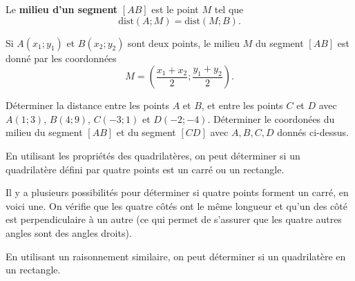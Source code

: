 \documentclass[a4paper,12pt]{report}
\begin{document}
\begin{boiteExT}
    \vspace{4cm}
\end{boiteExT}

\begin{defi}
    Le {\bfseries milieu d'un segment} $[AB]$ est le point $M$ tel que
    \[\text{dist}(A;M)=\text{dist}(M;B).\]
\end{defi}
        
\begin{rem}
    Si $A(x_1;y_1)$ et $B(x_2;y_2)$ sont deux points, le milieu $M$ du segment
    $[AB]$ est donné par les coordonnées
\[M=\left(\dfrac{x_1+x_2}{2};\dfrac{y_1+y_2}{2}\right).\]
\end{rem}
    

\begin{exo}
\begin{tasks}
    \task Déterminer la distance entre les points $A$ et $B$, et entre les points $C$ et $D$ avec $A(1;3)$, $B(4;9)$, $C(-3;1)$ et $D(-2;-4)$. 
    \task Déterminer le coordonées du milieu du segment $[AB]$ et du segment $[CD]$ avec $A, B, C, D$ donnés ci-dessus. 
\end{tasks}
\end{exo}

En utilisant les propriétés des quadrilatères, on peut déterminer si un quadrilatère défini par quatre points est un carré ou un rectangle.

\begin{rem}
Il y a plusieurs possibilités pour déterminer si quatre points forment un
carré, en voici une. On vérifie que les quatre côtés ont le même longueur et qu'un des côté est perpendiculaire à un autre (ce qui permet de s'assurer que les quatre autres angles sont des angles droits). 
    
        En utilisant un raisonnement similaire, on peut déterminer si un quadrilatère en un rectangle. 
\end{rem}

\begin{boiteExT}
    \vspace{15cm} 
\end{boiteExT}
    
\end{document}
